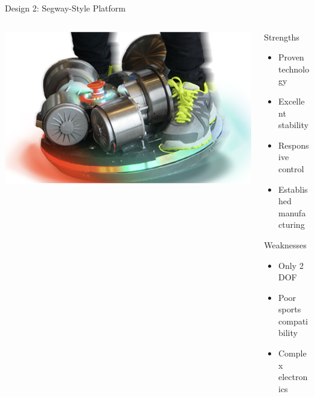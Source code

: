 \documentclass[aspectratio=169]{beamer}
\begin{document}
\begin{frame}{Design 2: Segway-Style Platform}
\begin{columns}[c]
\begin{column}{0.5\textwidth}
\includegraphics[height=0.6\textheight]{pdpAssets/SegwayStyleSelfBalancingPlatform.png}
\end{column}

\begin{column}{0.48\textwidth}
\begin{block}{Strengths}
\begin{itemize}
    \item Proven technology
    \item Excellent stability
    \item Responsive control
    \item Established manufacturing
\end{itemize}
\end{block}

\begin{block}{Weaknesses}
\begin{itemize}
    \item Only 2 DOF
    \item Poor sports compatibility
    \item Complex electronics
\end{itemize}
\end{block}
\end{column}
\end{columns}
\end{frame}
\end{document}
